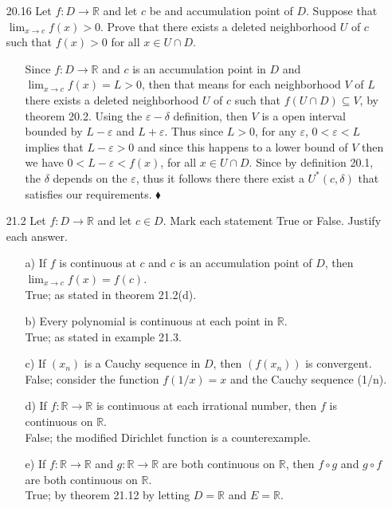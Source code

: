 \documentclass[12pt]{article}
\begin{document}
\begin{enumerate}
\begin{enumerate}
\item[20.16] Let $f: D \rightarrow \mathbb{R}$ and let $c$ be and accumulation point of $D$. Suppose that $\lim_{x \rightarrow c}f(x) > 0$. Prove that there exists a deleted neighborhood $U$ of $c$ such that $f(x) > 0$ for all $x \in U \cap D$.
\begin{enumerate}
\item[] Since $f: D \rightarrow \mathbb{R}$ and $c$ is an accumulation point in $D$ and 
$\lim_{x \to c}f(x) = L > 0$, then that means for each neighborhood $V$ of $L$ there exists
a deleted neighborhood $U$ of $c$ such that $f(U \cap D) \subseteq V$, by theorem 20.2.
Using the $\varepsilon - \delta$ definition, then $V$ is a open interval bounded by
$L - \varepsilon$ and $L + \varepsilon$. Thus since $L > 0$, for any $\varepsilon$,
$0 < \varepsilon < L$ implies that $L - \varepsilon > 0$ and since this happens
to a lower bound of $V$ then we have $0 < L - \varepsilon < f(x)$, for all $x \in U \cap D$. 
Since by definition 20.1, the $\delta$ depends on the $\varepsilon$, 
thus it follows there there exist a $U^*(c, \delta)$ that satisfies our requirements.
$\blacklozenge$
\end{enumerate}

\item[21.2] Let $f: D \rightarrow \mathbb{R}$ and let $c \in D$. Mark each statement True or False. Justify each answer.
\begin{enumerate}
\item[a)] If $f$ is continuous at $c$ and $c$ is an accumulation point of $D$, then $\lim_{x \to c}f(x) = f(c)$. \\
True; as stated in theorem 21.2(d).
\item[b)] Every polynomial is continuous at each point in $\mathbb{R}$. \\
True; as stated in example 21.3.
\item[c)] If $(x_n)$ is a Cauchy sequence in $D$, then $(f(x_n))$ is convergent. \\
False; consider the function $f(1/x) = x$ and the Cauchy sequence (1/n).
\item[d)] If $f: \mathbb{R} \rightarrow \mathbb{R}$ is continuous at each irrational number, then $f$ is continuous on $\mathbb{R}$. \\
False; the modified Dirichlet function is a counterexample.
\item[e)] If $f: \mathbb{R} \rightarrow \mathbb{R}$ and $g: \mathbb{R} \rightarrow \mathbb{R}$ are both continuous on $\mathbb{R}$, then $f \circ g$ and $g \circ f$ are both continuous on $\mathbb{R}$. \\
True; by theorem 21.12 by letting $D = \mathbb{R}$ and $E = \mathbb{R}$.
\end{enumerate}


\end{enumerate}
\end{enumerate}
\end{document}
